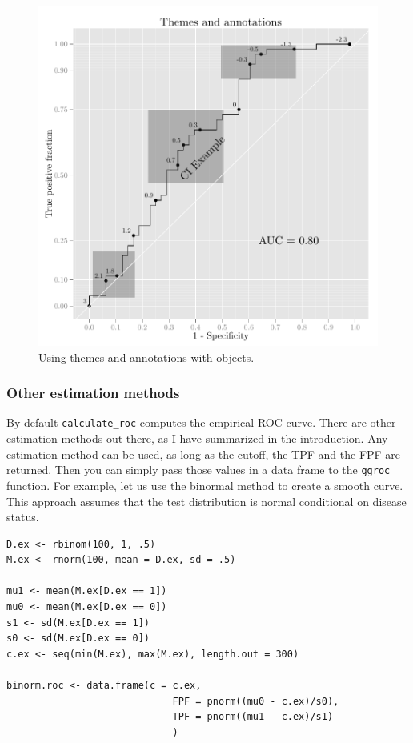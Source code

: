 \documentclass[article]{jss}
\begin{document}
\begin{figure}[htbp]
\centering
\includegraphics{figure/print2-1.pdf}
\caption{Using  themes and annotations with 
objects. \label{annotate}}
\end{figure}

\subsubsection{Other estimation methods}\label{other-estimation-methods}

By default \texttt{calculate\_roc} computes the empirical ROC curve.
There are other estimation methods out there, as I have summarized in
the introduction. Any estimation method can be used, as long as the
cutoff, the TPF and the FPF are returned. Then you can simply pass those
values in a data frame to the \texttt{ggroc} function. For example, let
us use the binormal method to create a smooth curve. This approach
assumes that the test distribution is normal conditional on disease
status.

\begin{verbatim}
D.ex <- rbinom(100, 1, .5)
M.ex <- rnorm(100, mean = D.ex, sd = .5)

mu1 <- mean(M.ex[D.ex == 1])
mu0 <- mean(M.ex[D.ex == 0])
s1 <- sd(M.ex[D.ex == 1])
s0 <- sd(M.ex[D.ex == 0])
c.ex <- seq(min(M.ex), max(M.ex), length.out = 300)

binorm.roc <- data.frame(c = c.ex, 
                             FPF = pnorm((mu0 - c.ex)/s0), 
                             TPF = pnorm((mu1 - c.ex)/s1)
                             )
\end{verbatim}
\end{document}
